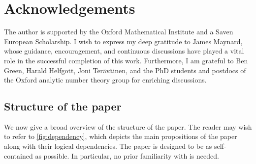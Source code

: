 \documentclass[11pt]{amsart}
\theoremstyle{definition}
\begin{document}
\section*{Acknowledgements}

The author is supported by the Oxford Mathematical Institute and a Saven European Scholarship. I wish to express my deep gratitude to James Maynard, whose guidance, encouragement, and continuous discussions have played a vital role in the successful completion of this work. Furthermore, I am grateful to Ben Green, Harald Helfgott, Joni Teräväinen, and the PhD students and postdocs of the Oxford analytic number theory group for enriching discussions.



\subsection{Structure of the paper}
We now give a broad overview of the structure of the paper. The reader may wish to refer to \cref{fig:dependency}, which depicts the main propositions of the paper along with their logical dependencies. The paper is designed to be as self-contained as possible. In particular, no prior familiarity with \cite{HR} is needed.
\end{document}

